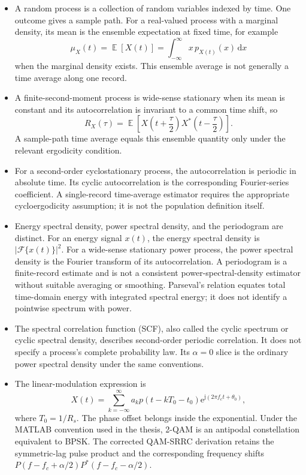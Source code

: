 \documentclass[12pt]{article}
\DeclareMathOperator{\Expect}{\mathbb{E}}
\begin{document}
\begin{itemize}
  \item A random process is a collection of random variables indexed by time. One outcome gives a sample path. For a real-valued process with a marginal density, its mean is the ensemble expectation at fixed time, for example
  \[
    \mu_X(t)=\Expect[X(t)]=\int_{-\infty}^{\infty}x\,p_{X(t)}(x)\,\mathrm{d}x
  \]
  when the marginal density exists. This ensemble average is not generally a time average along one record.

  \item A finite-second-moment process is wide-sense stationary when its mean is constant and its autocorrelation is invariant to a common time shift, so
  \[
    R_X(\tau)=\Expect\left[X\!\left(t+\frac{\tau}{2}\right)
      X^*\!\left(t-\frac{\tau}{2}\right)\right].
  \]
  A sample-path time average equals this ensemble quantity only under the relevant ergodicity condition.

  \item For a second-order cyclostationary process, the autocorrelation is periodic in absolute time. Its cyclic autocorrelation is the corresponding Fourier-series coefficient. A single-record time-average estimator requires the appropriate cycloergodicity assumption; it is not the population definition itself.

  \item Energy spectral density, power spectral density, and the periodogram are distinct. For an energy signal $x(t)$, the energy spectral density is $|\mathcal{F}\{x(t)\}|^2$. For a wide-sense stationary power process, the power spectral density is the Fourier transform of its autocorrelation. A periodogram is a finite-record estimate and is not a consistent power-spectral-density estimator without suitable averaging or smoothing. \mbox{Parseval's} relation equates total time-domain energy with integrated spectral energy; it does not identify a pointwise spectrum with power.

  \item The spectral correlation function (SCF), also called the cyclic spectrum or cyclic spectral density, describes second-order periodic correlation. It does not specify a process's complete probability law. Its $\alpha=0$ slice is the ordinary power spectral density under the same conventions.

  \item The linear-modulation expression is
  \[
    X(t)=\sum_{k=-\infty}^{\infty}a_k p(t-kT_0-t_0)
    \mathrm{e}^{\mathrm{j}(2\pi f_c t+\theta_0)},
  \]
  where $T_0=1/R_s$. The phase offset belongs inside the exponential. Under the MATLAB convention used in the thesis, 2-QAM is an antipodal constellation equivalent to BPSK. The corrected QAM-SRRC derivation retains the symmetric-lag pulse product and the corresponding frequency shifts $P(f-f_c+\alpha/2)P^*(f-f_c-\alpha/2)$.
\end{itemize}
\end{document}

